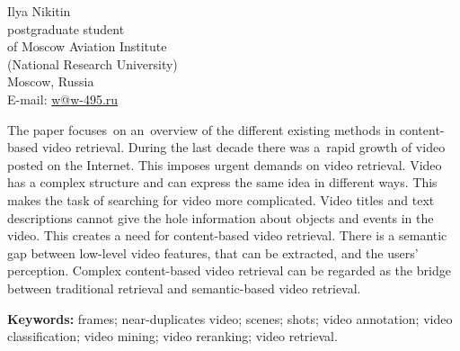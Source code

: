 

\begin{flushright}
\sf\small
Ilya Nikitin \\
postgraduate student \\
of Moscow Aviation Institute \\
(National Research University) \\
Moscow, Russia \\
E-mail: \href{mailto:w@w-495.ru}{w@w-495.ru} \\
\end{flushright}





The paper focuses on an overview of the different existing methods
in content-based video retrieval.
During the last decade there was a~rapid growth
of video posted on the Internet.
This imposes urgent demands on video retrieval.
Video has a complex structure and can express the same idea
in different ways. This makes the task of searching for video more complicated.
Video titles and text descriptions cannot give the hole information
about objects and events in the video.
This creates a need for content-based video retrieval.
There is a semantic gap between low-level video features,
that can be extracted, and the users' perception.
Complex content-based video retrieval
can be regarded as the bridge between traditional retrieval
and semantic-based video retrieval.


{\bf Keywords:}
frames;
near-duplicates video;
scenes;
shots;
video annotation;
video classification;
video mining;
video reranking;
video retrieval.



